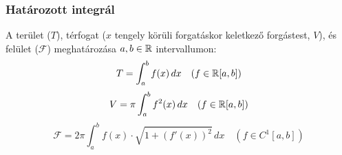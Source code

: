 \documentclass[a4paper,11.5pt]{article}
\begin{document}
	\subsubsection{Határozott integrál}
	A terület ($T$), térfogat ($x$ tengely körüli forgatáskor keletkező forgástest, $V$), és felület ($\mathcal{F}$) meghatározása $a,b\in\mathbb{R}$ intervallumon:
	\[ T=\int_a^bf(x)\,dx\quad (f\in\mathbb{R}[a,b]) \]
	\[ V=\pi\int_a^bf^2(x)\,dx\quad (f\in\mathbb{R}[a,b]) \]
	\[ \mathcal{F}=2\pi\int_a^bf(x)\cdot\sqrt{1+(f'(x))^2}\,dx\quad (f\in C^1[a,b]) \]
\end{document}
